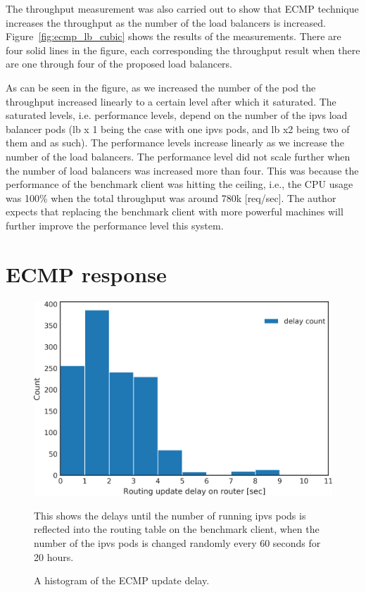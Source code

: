 The throughput measurement was also carried out to show that ECMP technique increases the throughput as the number of the load balancers is increased.
Figure~\ref{fig:ecmp_lb_cubic} shows the results of the measurements.
There are four solid lines in the figure, each corresponding the throughput result when there are one through four of the proposed load balancers.

As can be seen in the figure, as we increased the number of the pod the throughput increased linearly to a certain level after which it saturated.
The saturated levels, i.e. performance levels, depend on the number of the ipvs load balancer pods (lb x 1 being the case with one ipvs pods, and lb x2 being two of them and as such).
The performance levels increase linearly as we increase the number of the load balancers.
The performance level did not scale further when the number of load balancers was increased more than four.
This was because the performance of the benchmark client was hitting the ceiling, i.e., the CPU usage was 100\% when the total throughput was around 780k [req/sec].
The author expects that replacing the benchmark client with more powerful machines will further improve the performance level this system.

\FloatBarrier

\section{ECMP response}

\begin{figure}[t]
  \includegraphics[width=0.9\columnwidth,left]{Figs/ecmp_delay_histgram}
  \caption{A histogram of the ECMP update delay.}
This shows the delays until the number of running ipvs pods is reflected into the routing table on the benchmark client,
when the number of the ipvs pods is changed randomly every 60 seconds for 20 hours.
  \label{fig:ecmp_delay_histgram}
\end{figure}

